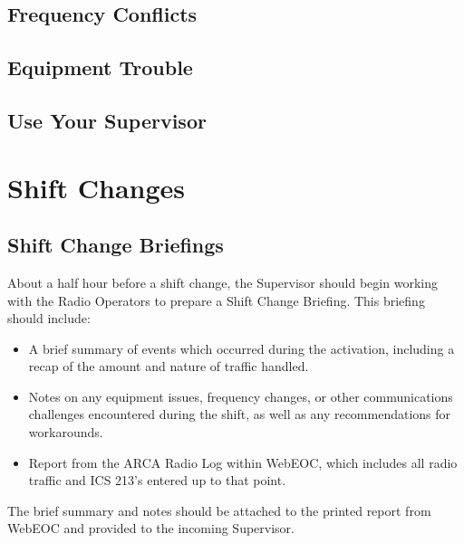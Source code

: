 \documentclass[pdflatex,letterpaper,twoside,12pt]{book}
\begin{document}
\subsection{Frequency Conflicts}


\subsection{Equipment Trouble}


\subsection{Use Your Supervisor}



\section{Shift Changes}

\subsection{Shift Change Briefings}

About a half hour before a shift change, the Supervisor should begin working with the Radio Operators to prepare a Shift Change Briefing.  This briefing should include:

\begin{itemize}
	\item A brief summary of events which occurred during the activation, including a recap of the amount and nature of traffic handled.
	\item Notes on any equipment issues, frequency changes, or other communications challenges encountered during the shift, as well as any recommendations for workarounds.
	\item Report from the ARCA Radio Log within WebEOC, which includes all radio traffic and ICS 213's entered up to that point.
\end{itemize}

The brief summary and notes should be attached to the printed report from WebEOC and provided to the incoming Supervisor.
\end{document}
